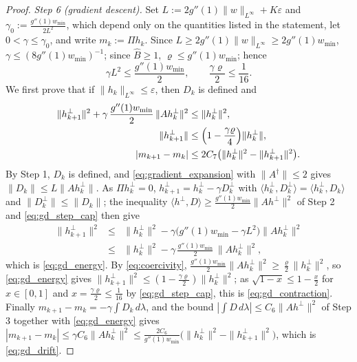 \begin{proof}
\emph{Step 6 (gradient descent).} Set $L:=2g''(1)\|w\|_{L^\infty}+K\varepsilon$ and $\gamma_0:=\frac{g''(1)w_{\min}}{2L^2}$, which depend only on the quantities listed in the statement, let $0<\gamma\leq\gamma_0$, and write $m_k:=\Pi h_k$. Since $L\geq2g''(1)\|w\|_{L^\infty}\geq2g''(1)w_{\min}$, $\gamma\leq(8g''(1)w_{\min})^{-1}$; since $\widehat B\geq1$, $\varrho\leq g''(1)w_{\min}$; hence
\begin{equation}\label{eq:gd_step_cap}
    \gamma L^2\leq\frac{g''(1)w_{\min}}2,\qquad\frac{\gamma\varrho}2\leq\frac1{16}.
\end{equation}
We first prove that if $\|h_k\|_{L^\infty}\leq\varepsilon$, then $D_k$ is defined and
\begin{align}
    \|h^\perp_{k+1}\|^2+\gamma\,\frac{g''(1)w_{\min}}2\,\|Ah^\perp_k\|^2&\leq\|h^\perp_k\|^2,\label{eq:gd_energy}\\
    \|h^\perp_{k+1}\|&\leq\Bigl(1-\frac{\gamma\varrho}4\Bigr)\|h^\perp_k\|,\label{eq:gd_contraction}\\
    |m_{k+1}-m_k|&\leq2C_7\bigl(\|h^\perp_k\|^2-\|h^\perp_{k+1}\|^2\bigr).\label{eq:gd_drift}
\end{align}
By Step 1, $D_k$ is defined, and \eqref{eq:gradient_expansion} with $\|A^\dagger\|\leq2$ gives $\|D_k\|\leq L\|Ah^\perp_k\|$. As $\Pi h^\perp_k=0$, $h^\perp_{k+1}=h^\perp_k-\gamma D_k^\perp$ with $\langle h^\perp_k,D_k^\perp\rangle=\langle h^\perp_k,D_k\rangle$ and $\|D^\perp_k\|\leq\|D_k\|$; the inequality $\langle h^\perp,D\rangle\geq\frac{g''(1)w_{\min}}2\|Ah^\perp\|^2$ of Step 2 and \eqref{eq:gd_step_cap} then give
\begin{eqnarray*}
    \|h^\perp_{k+1}\|^2&\leq&\|h^\perp_k\|^2-\gamma\bigl(g''(1)w_{\min}-\gamma L^2\bigr)\|Ah^\perp_k\|^2\\
    &\leq&\|h^\perp_k\|^2-\gamma\,\frac{g''(1)w_{\min}}2\,\|Ah^\perp_k\|^2,
\end{eqnarray*}
which is \eqref{eq:gd_energy}. By \eqref{eq:coercivity}, $\frac{g''(1)w_{\min}}2\|Ah^\perp_k\|^2\geq\frac\varrho2\|h^\perp_k\|^2$, so \eqref{eq:gd_energy} gives $\|h^\perp_{k+1}\|^2\leq(1-\frac{\gamma\varrho}2)\|h^\perp_k\|^2$; as $\sqrt{1-x}\leq1-\frac x2$ for $x\in[0,1]$ and $x=\frac{\gamma\varrho}2\leq\frac1{16}$ by \eqref{eq:gd_step_cap}, this is \eqref{eq:gd_contraction}. Finally $m_{k+1}-m_k=-\gamma\int D_k\,d\lambda$, and the bound $|\int D\,d\lambda|\leq C_6\|Ah^\perp\|^2$ of Step 3 together with \eqref{eq:gd_energy} gives $|m_{k+1}-m_k|\leq\gamma C_6\|Ah^\perp_k\|^2\leq\frac{2C_6}{g''(1)w_{\min}}\bigl(\|h^\perp_k\|^2-\|h^\perp_{k+1}\|^2\bigr)$, which is \eqref{eq:gd_drift}.


\end{proof}
